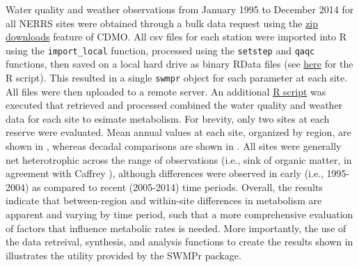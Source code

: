 \documentclass[10pt,letterpaper]{article}\usepackage[]{graphicx}\usepackage[]{color}
\begin{document}
Water quality and weather observations from January 1995 to December 2014 for all \ac{NERRS} sites were obtained through a bulk data request using the \href{http://cdmo.baruch.sc.edu/aqs/zips.cfm}{zip downloads} feature of \ac{CDMO}.  All csv files for each station were imported into R using the \texttt{import\_local} function, processed using the \texttt{setstep} and \texttt{qaqc} functions, then saved on a local hard drive as binary RData files (see \href{https://github.com/fawda123/swmp_rats/blob/master/R/dat_proc.R}{here} for the R script). This resulted in a single \texttt{swmpr} object for each parameter at each site.  All files were then uploaded to a remote server.  An additional \href{https://gist.github.com/fawda123/4fc51c2cb86341ed9291}{R script} was executed that retrieved and processed combined the water quality and weather data for each site to esimate metabolism.  For brevity, only two sites at each reserve were evaluated.  Mean annual values at each site, organized by region, are shown in , whereas decadal comparisons are shown in .  All sites were generally net heterotrophic across the range of observations (i.e., sink of organic matter, in agreement with Caffrey \cite{Caffrey03}), although differences were observed in early (i.e., 1995-2004) as compared to recent (2005-2014) time periods. Overall, the results indicate that between-region and within-site differences in metabolism are apparent and varying by time period, such that a more comprehensive evaluation of factors that influence metabolic rates is needed.  More importantly, the use of the data retreival, synthesis, and analysis functions to create the results shown in  illustrates the utility provided by the SWMPr package.
\end{document}
